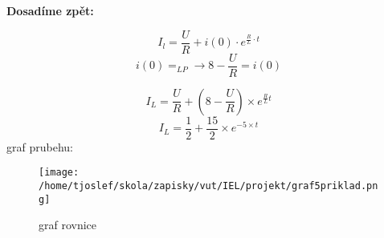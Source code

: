 \textbf{Dosadíme zpět:}

\[
I_l = \frac{U}{R} + i(0) \cdot e^{\frac{R}{L} \cdot t}
\]
\[
    i(0) = _{LP} \rightarrow 8 - \frac{U}{R} = i(0)
\]

\[
    I_L = \frac{U}{R} + (8 - \frac{U}{R}) \times e^{\frac{R}{L} t}
\]
\[
I_L = \frac{1}{2} + \frac{15}{2} \times e^ {-5 \times t}
\]
graf prubehu:

\begin{figure}[!ht]
  \centering
  \texttt{[image: /home/tjoslef/skola/zapisky/vut/IEL/projekt/graf5priklad.png]}
  \caption{graf rovnice}
  \label{fig:graf prubehu}
\end{figure}


